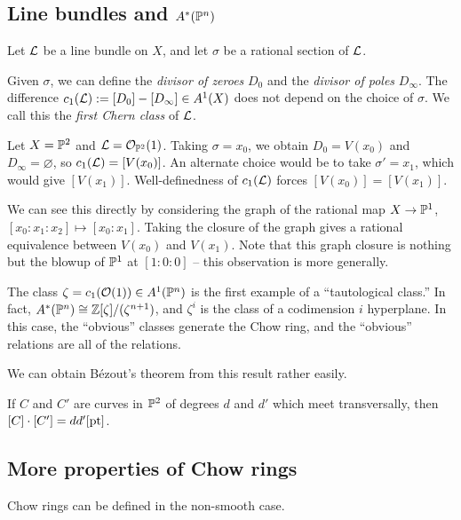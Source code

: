 \documentclass{amsart}
\begin{document}
\subsection{Line bundles and $A^*(\mathbb{P}^n)$}

Let $\mathcal{L}$ be a line bundle on $X$, and let $\sigma$ be a rational section of $\mathcal{L}$.

\begin{dfn}
	Given $\sigma$, we can define the \emph{divisor of zeroes} $D_0$ and the \emph{divisor of poles} $D_\infty$.
	The difference $c_1(\mathcal{L}) := [D_0] - [D_\infty] \in A^1(X)$ does not depend on the choice of $\sigma$.
	We call this the \emph{first Chern class} of $\mathcal{L}$.
\end{dfn}

\begin{ex}
	Let $X = \mathbb{P}^2$ and $\mathcal{L} = \mathcal{O}_{\mathbb{P}^2}(1)$.
	Taking $\sigma = x_0$, we obtain $D_0 = V(x_0)$ and $D_\infty = \varnothing$, so $c_1(\mathcal{L}) = [V(x_0)]$.
	An alternate choice would be to take $\sigma' = x_1$, which would give $[V(x_1)]$.
	Well-definedness of $c_1(\mathcal{L})$ forces $[V(x_0)] = [V(x_1)]$.

	We can see this directly by considering the graph of the rational map $X \to \mathbb{P}^1$, $[x_0 : x_1 : x_2] \mapsto [x_0 : x_1]$.
	Taking the closure of the graph gives a rational equivalence between $V(x_0)$ and $V(x_1)$.
	Note that this graph closure is nothing but the blowup of $\mathbb{P}^1$ at $[1 : 0 : 0]$ -- this observation is more generally.
\end{ex}

The class $\zeta = c_1(\mathcal{O}(1)) \in A^1(\mathbb{P}^n)$ is the first example of a ``tautological class.''
In fact, $A^*(\mathbb{P}^n) \cong \mathbb{Z}[\zeta] / (\zeta^{n+1})$, and $\zeta^i$ is the class of a codimension $i$ hyperplane.
In this case, the ``obvious'' classes generate the Chow ring, and the ``obvious'' relations are all of the relations.

We can obtain B\'ezout's theorem from this result rather easily.

\begin{thm}[B\'ezout]
	If $C$ and $C'$ are curves in $\mathbb{P}^2$ of degrees $d$ and $d'$ which meet transversally, then $[C] \cdot [C'] = d d' [\mathrm{pt}]$.
\end{thm}

\subsection{More properties of Chow rings}

Chow rings can be defined in the non-smooth case.
\end{document}

